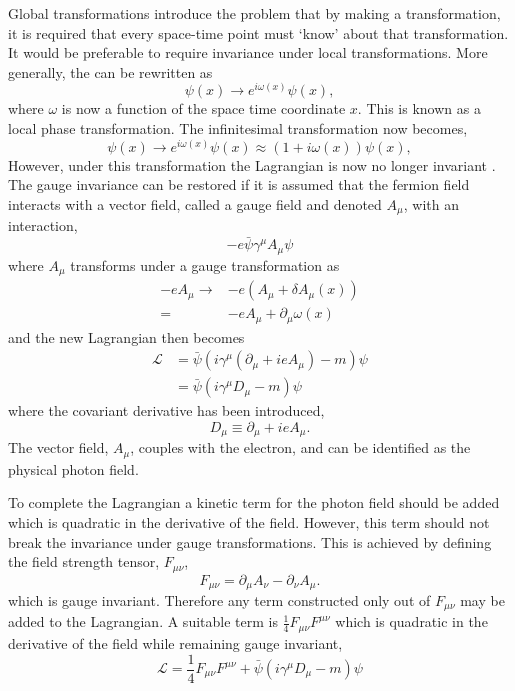 Global transformations introduce the problem that by making a transformation, it
is required that every space-time point must `know' about that transformation. It would be
preferable to require invariance under local transformations.
More generally, the  can be rewritten as
\begin{equation}
\psi(x) \to e^{i\omega(x)} \psi(x),
\label{eq:local}
\end{equation}
where $\omega$ is now a function of the space time coordinate $x$. This is known
as a local phase transformation. The infinitesimal transformation now becomes,
\begin{equation}
\psi(x) 
\to e^{i\omega(x)} \psi(x)
\approx (1+i\omega(x))\psi(x),
\end{equation}
However, under this transformation the Lagrangian is now no longer
invariant \cite{halzen1984quarks}.
The gauge invariance can be restored if it is assumed that the fermion field
interacts with a vector field, called a gauge field and denoted $A_{\mu}$, with
an interaction,
\begin{equation}
-e\bar{\psi}\gamma^{\mu}A_{\mu}\psi
\end{equation}
where $A_\mu$ transforms under a gauge transformation as 
\begin{align}
-eA_{\mu} \to & -e\left(A_{\mu}+\delta A_{\mu}(x)\right)\\
           =   & -e A_{\mu} + \partial_{\mu} \omega (x)
\end{align}
and the new Lagrangian then becomes
\begin{align}
\mathcal{L} 
&= \bar{\psi}( i\gamma^{\mu} ( \partial_{\mu} +i e A_{\mu}) - m)\psi \\
&= \bar{\psi}( i\gamma^{\mu} D_{\mu} - m)\psi 
\end{align}
where the covariant derivative has been introduced,
\begin{equation}
D_{\mu} \equiv \partial_{\mu} + i e A_{\mu}.
\label{eq:covar_deriv}
\end{equation}
The vector field, $A_{\mu}$, couples with the electron, and can be identified as
the physical photon field. 

To complete the Lagrangian a kinetic term for the photon field should be added
which is quadratic in the derivative of the field.
However, this term should not break the invariance under gauge transformations.
This is achieved by defining the field strength tensor, $F_{\mu\nu}$,
\begin{equation}
F_{\mu\nu}
= \partial_{\mu} A_{\nu} - \partial_{\nu} A_{\mu}.
\label{eq:fieldstrengthtensor}
\end{equation}
which is gauge invariant. Therefore any term constructed only out of 
 $F_{\mu\nu}$ may be added to the Lagrangian.
A suitable term is $\frac{1}{4} F_{\mu\nu} F^{\mu\nu}$ which is quadratic in the
derivative of the field while remaining gauge invariant,
\begin{equation}
\mathcal{L} = \frac{1}{4} F_{\mu\nu} F^{\mu\nu} + \bar{\psi}( i\gamma^{\mu} D_{\mu} - m)\psi 
\end{equation}


